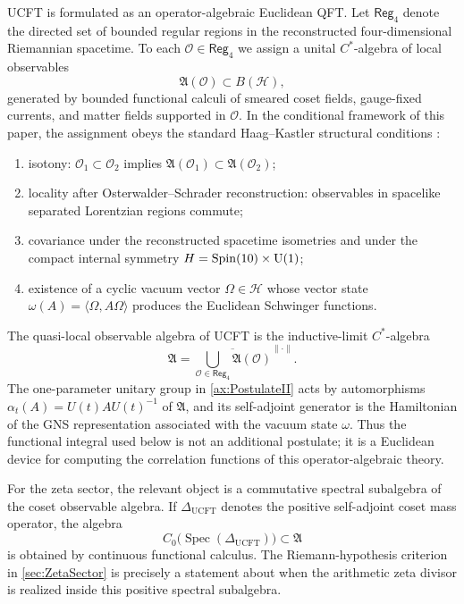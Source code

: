 \documentclass[pdflatex,sn-mathphys-num]{sn-jnl}
\theoremstyle{thmstyleone}
\theoremstyle{thmstylethree}%
\theoremstyle{thmstyletwo}%
\begin{document}
UCFT is formulated as an operator-algebraic Euclidean QFT. Let
\(\mathsf{Reg}_{4}\) denote the directed set of bounded regular regions in the
reconstructed four-dimensional Riemannian spacetime. To each
\(\mathcal O\in\mathsf{Reg}_{4}\) we assign a
unital \(C^{*}\)-algebra of local observables
\[
  \mathfrak A(\mathcal O)\subset B(\mathcal H),
\]
generated by bounded functional calculi of smeared coset fields, gauge-fixed
currents, and matter fields supported in \(\mathcal O\). In the conditional
framework of this paper, the assignment obeys the standard Haag--Kastler
structural conditions
\cite{Haag1996,Araki1999,BratteliRobinson1987}:
\begin{enumerate}
\item isotony:
      \(\mathcal O_{1}\subset\mathcal O_{2}\) implies
      \(\mathfrak A(\mathcal O_{1})\subset\mathfrak A(\mathcal O_{2})\);
\item locality after Osterwalder--Schrader reconstruction: observables in
      spacelike separated Lorentzian regions commute;
\item covariance under the reconstructed spacetime isometries and under the
      compact internal symmetry \(H=\operatorname{Spin}(10) \times \mathrm{U(1)}\);
\item existence of a cyclic vacuum vector \(\Omega\in\mathcal H\) whose vector
      state \(\omega(A)=\langle\Omega,A\Omega\rangle\) produces the Euclidean
      Schwinger functions.
\end{enumerate}
The quasi-local observable algebra of UCFT is the inductive-limit
\(C^{*}\)-algebra
\[
  \mathfrak A
  =
  \overline{\bigcup_{\mathcal O\in\mathsf{Reg}_{4}}\mathfrak A(\mathcal O)}
  ^{\|\cdot\|}.
\]
The one-parameter unitary group in \autoref{ax:PostulateII} acts by automorphisms
\(\alpha_t(A)=U(t)AU(t)^{-1}\) of \(\mathfrak A\), and its self-adjoint
generator is the Hamiltonian of the GNS representation associated with the
vacuum state \(\omega\). Thus the functional integral used below is not an
additional postulate; it is a Euclidean device for computing the correlation
functions of this operator-algebraic theory.

For the zeta sector, the relevant object is a commutative spectral subalgebra
of the coset observable algebra. If \(\Delta_{\mathrm{UCFT}}\) denotes the
positive self-adjoint coset mass operator, the algebra
\[
  C_{0}\bigl(\operatorname{Spec}(\Delta_{\mathrm{UCFT}})\bigr)
  \subset \mathfrak A
\]
is obtained by continuous functional calculus. The Riemann-hypothesis criterion
in \autoref{sec:ZetaSector} is precisely a statement about when the arithmetic
zeta divisor is realized inside this positive spectral subalgebra.
\end{document}
